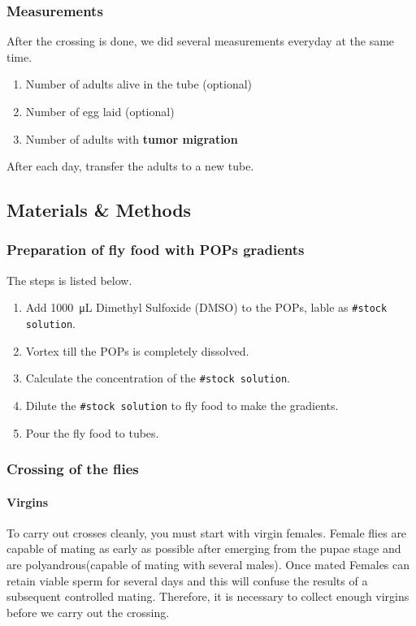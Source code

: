 \subsubsection{Measurements}
After the crossing is done, we did several measurements everyday at the same time.

\begin{enumerate}
    \item Number of adults alive in the tube (optional)
    \item Number of egg laid (optional)
    \item Number of adults with \textbf{tumor migration}
\end{enumerate}
After each day, transfer the adults to a new tube.

\subsection{Materials \& Methods}

\subsubsection{Preparation of fly food with POPs gradients}
The steps is listed below.
\begin{enumerate}
    \item Add \SI{1000}{\micro\liter} Dimethyl Sulfoxide (DMSO) to the POPs, lable as \texttt{\#stock solution}.
    \item Vortex till the POPs is completely dissolved.
    \item Calculate the concentration of the \texttt{\#stock solution}.
    \item Dilute the \texttt{\#stock solution} to fly food to make the gradients.
    \item Pour the fly food to tubes.
\end{enumerate}

\subsubsection{Crossing of the flies}

\paragraph{Virgins}
To carry out crosses cleanly, you must start with virgin females. Female flies are capable of mating as early as possible after emerging from the pupae stage and are polyandrous(capable of mating with several males). Once mated Females can retain viable sperm for several days and this will confuse the results of a subsequent controlled mating. Therefore, it is necessary to collect enough virgins before we carry out the crossing.

